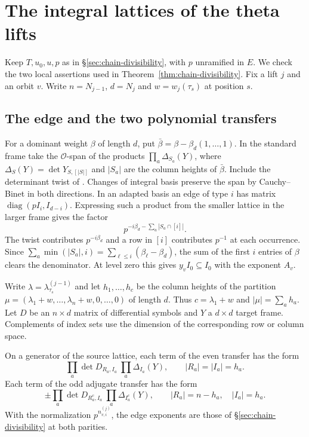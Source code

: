 \section{The integral lattices of the theta lifts}\label{sec:integral-lifts}

Keep $T,u_0,u,p$ as in \S\ref{sec:chain-divisibility}, with $p$ unramified
in $E$. We check the two local assertions used in
Theorem~\ref{thm:chain-divisibility}. Fix a lift $j$ and an orbit $v$.
Write $n=N_{j-1}$, $d=N_j$ and $w=w_j(\tau_s)$ at position $s$.

\subsection{The edge and the two polynomial transfers}

For a dominant weight $\beta$ of length $d$, put
$\bar\beta=\beta-\beta_d(1,\ldots,1)$. In the standard frame take the
$\mathcal O$-span of the products $\prod_a\Delta_{S_a}(Y)$, where
$\Delta_S(Y)=\det Y_{S,[|S|]}$ and $|S_a|$ are the column heights
of $\bar\beta$. Include the determinant twist of
\citep[Definition~11.3]{adriazola-grh}. Changes of integral basis preserve
the span by Cauchy--Binet in both directions. In an adapted basis an
edge of type $i$ has matrix $\operatorname{diag}(pI_i,I_{d-i})$.
Expressing such a product from the smaller lattice in the larger frame
gives the factor
\begin{equation}\label{eq:true-edge-factor}
                 p^{-i\beta_d-\sum_a|S_a\cap[i]|}.
\end{equation}
The twist contributes $p^{-i\beta_d}$ and a row in $[i]$
contributes $p^{-1}$ at each occurrence. Since
$\sum_a\min(|S_a|,i)=\sum_{\ell\le i}(\beta_\ell-\beta_d)$,
the sum of the first $i$ entries of $\beta$ clears the denominator.
At level zero this gives $y_v I_0\subseteq I_0$ with the exponent $A_v$.

Write $\lambda=\lambda^{(j-1)}_{\tau_s}$ and let
$h_1,\ldots,h_c$ be the column heights of the partition
$\mu=(\lambda_1+w,\ldots,\lambda_n+w,0,\ldots,0)$ of length $d$.
Thus $c=\lambda_1+w$ and $|\mu|=\sum_a h_a$. Let $D$ be an
$n\times d$ matrix of differential symbols and $Y$ a $d\times d$
target frame. Complements of index sets use the dimension of the
corresponding row or column space.

\begin{proposition}\label{prop:true-polynomials}
On a generator of the source lattice, each term of the even transfer
has the form
\[
          \prod_a\det D_{R_a,I_a}\ \prod_a\Delta_{I_a}(Y),
               \qquad |R_a|=|I_a|=h_a .
\]
Each term of the odd adjugate transfer has the form
\[
       \pm\prod_a\det D_{R_a^c,I_a}\ \prod_a\Delta_{I_a^c}(Y),
               \qquad |R_a|=n-h_a,\quad |I_a|=h_a .
\]
With the normalization $p^{n^{(j)}_{v,i}}$, the edge exponents
are those of \S\ref{sec:chain-divisibility} at both parities.
\end{proposition}

